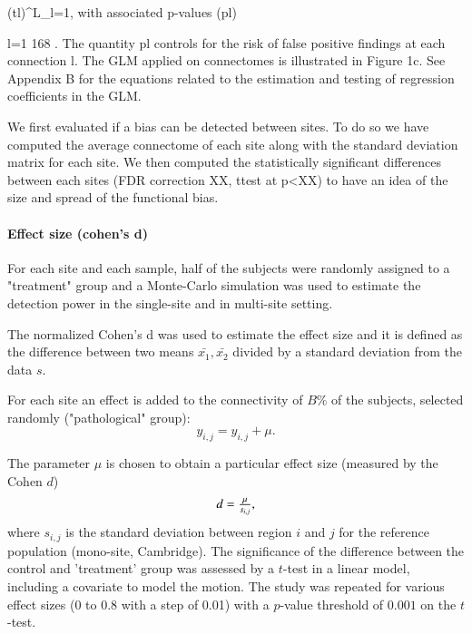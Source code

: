 \documentclass[authoryear]{elsarticle}
\begin{document}
(tl)^{L}_{l=1}, with associated p-values (pl)



l=1 168 . The quantity pl controls for the risk of false positive findings at each connection l. The GLM applied on connectomes is illustrated in Figure 1c. See Appendix B for the equations related to the estimation and testing of regression coefficients in the GLM.



We first evaluated if a bias can be detected between sites. To do so we have computed the average connectome of each site along with the standard deviation matrix for each site. We then computed the statistically significant differences between each sites (FDR correction XX, ttest at p<XX) to have an idea of the size and spread of the functional bias.





\paragraph{Effect size (cohen's d)}
For each site and each sample, half of the subjects were randomly assigned to a "treatment" group and a Monte-Carlo simulation was used to estimate the detection power in the single-site and in multi-site setting.

The normalized Cohen's d was used to estimate the effect size and it is defined as the difference between two means $\bar{x_{1}},\bar{x_{2}}$ divided by a standard deviation from the data $s$.

For each site an effect is added to the connectivity of $B\%$ of the subjects, selected randomly ("pathological" group):
\begin{equation}
	y_{i,j} = y_{i,j} + \mu.
\end{equation}

The parameter $\mu$ is chosen to obtain a particular effect size (measured by the Cohen $d$)
\begin{equation}\label{cohen's d}
    \begin{array}{l l}
      d = \frac{\mu}{s_{i,j}},      
    \end{array}
\end{equation}
where $s_{i,j}$ is the standard deviation between region $i$ and $j$ for the reference population (mono-site, Cambridge). The significance of the difference between the control and 'treatment' group was assessed by a $t$-test in a linear model, including a covariate to model the motion. The study was repeated for various effect sizes (0 to 0.8 with a step of 0.01) with a $p$-value threshold of $0.001$ on the $t$-test.
\end{document}
